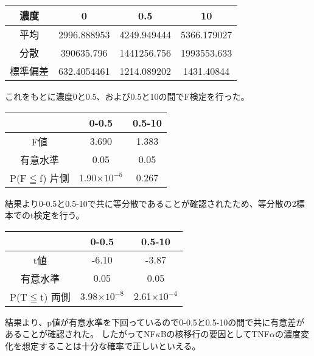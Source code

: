 \documentclass[a4paper,papersize,dvipdfmx]{jsarticle}
\begin{document}
\begin{table}[H]
\begin{center}
\begin{tabular}{|c|c|c|c|}
\hline
濃度   & 0           & 0.5         & 10          \\ \hline
平均   & 2996.888953 & 4249.949444 & 5366.179027 \\ \hline
分散   & 390635.796  & 1441256.756 & 1993553.633 \\ \hline
標準偏差 & 632.4054461 & 1214.089202 & 1431.40844  \\ \hline
\end{tabular}
\end{center}
\end{table}

これをもとに濃度0と0.5、および0.5と10の間でF検定を行った。

\begin{table}[H]
\begin{center}
\begin{tabular}{|c|c|c|}
\hline
& 0-0.5                & 0.5-10               \\ \hline
F値                   & 3.690 & 1.383 \\ \hline
有意水準                 & 0.05        & 0.05        \\ \hline
P(F$\leqq$f) 片側 & 1.90$\times10^{-5}$ & 0.267 \\ \hline
\end{tabular}
\end{center}
\end{table}

結果より0-0.5と0.5-10で共に等分散であることが確認されたため、等分散の2標本でのt検定を行う。

\begin{table}[H]
\begin{center}
\begin{tabular}{|c|c|c|}
\hline
& 0-0.5                & 0.5-10               \\ \hline
t値                   & -6.10 & -3.87 \\ \hline
有意水準                 & 0.05        & 0.05        \\ \hline
P(T$\leqq$t) 両側 & 3.98$\times10^{-8}$  & 2.61$\times10^{-4}$ \\ \hline
\end{tabular}
\end{center}
\end{table}

結果より、p値が有意水準を下回っているので0-0.5と0.5-10の間で共に有意差があることが確認された。
したがってNF$\kappa$Bの核移行の要因としてTNF$\alpha$の濃度変化を想定することは十分な確率で正しいといえる。
\end{document}
